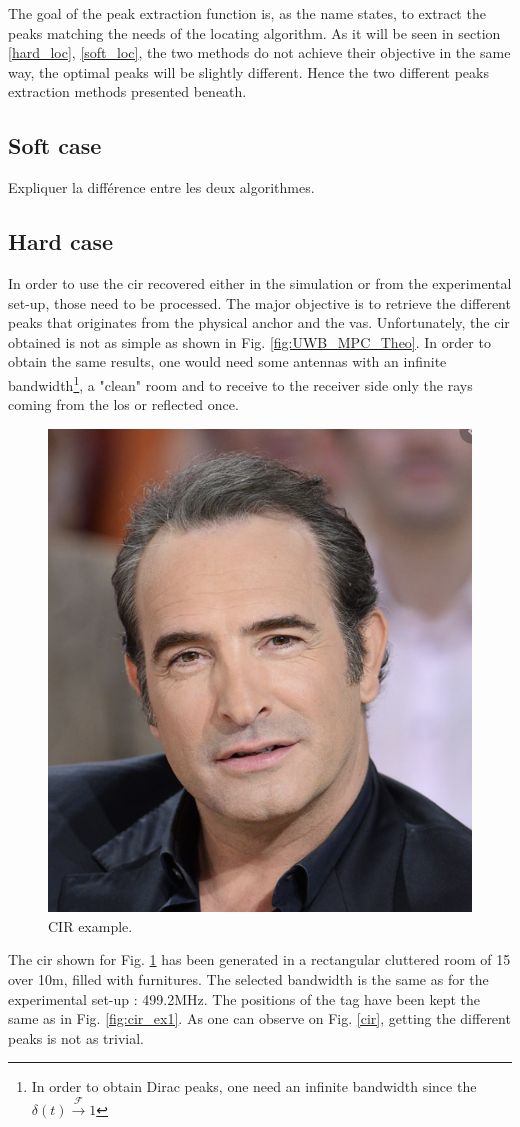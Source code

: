 The goal of the peak extraction function is, as the name states, to extract the peaks matching the needs of the locating algorithm. As it will be seen in section \ref{hard_loc}, \ref{soft_loc}, the two methods do not achieve their objective in the same way, the optimal peaks will be slightly different. Hence the two different peaks extraction methods presented beneath.

\subsection{Soft case}

Expliquer la différence entre les deux algorithmes.

\subsection{Hard case}

In order to use the \gls{cir} recovered either in the simulation or from the experimental set-up, those need to be processed. The major objective is to retrieve the different peaks that originates from the physical anchor and the \glspl{va}. Unfortunately, the \gls{cir} obtained is not as simple as shown in Fig. \ref{fig:UWB_MPC_Theo}. In order to obtain the same results, one would need some antennas with an infinite bandwidth\footnote{In order to obtain Dirac peaks, one need an infinite bandwidth since the $\delta(t) \xrightarrow{\mathscr{F}} 1 $}, a "clean" room and to receive to the receiver side only the rays coming from the \gls{los} or reflected once.
\vspace{2mm}

\begin{figure}[H]
\centering
\includegraphics[width=.2\linewidth]{Images/Temporary_pic.png}
\caption{CIR example. \label{fig:cir_example}}
\end{figure}

The \gls{cir} shown for Fig. \ref{fig:cir_example} has been generated in a rectangular cluttered room of 15 over 10m, filled with furnitures. The selected bandwidth is the same as for the experimental set-up : 499.2MHz. The positions of the tag have been kept the same as in Fig. \ref{fig:cir_ex1}. As one can observe on Fig. \ref{cir}, getting the different peaks is not as trivial.
\vspace{2mm}

